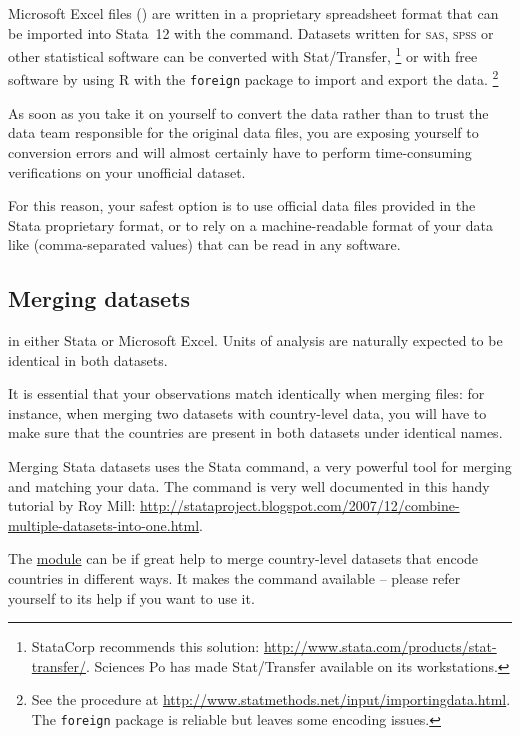 Microsoft Excel files () are written in a proprietary spreadsheet format that can be imported into Stata~12 with the  command. Datasets written for \textsc{sas}, \textsc{spss} or other statistical software can be converted with Stat/Transfer,%
  \footnote{StataCorp recommends this solution: \url{http://www.stata.com/products/stat-transfer/}. Sciences Po has made Stat/Transfer available on its workstations.} %
  or with free software by using R with the \texttt{foreign} package to import and export the data.%
  \footnote{See the procedure at \url{http://www.statmethods.net/input/importingdata.html}. The \texttt{foreign} package is reliable but leaves some encoding issues.}%

As soon as you take it on yourself to convert the data rather than to trust the data team responsible for the original data files, you are exposing yourself to conversion errors and will almost certainly have to perform time-consuming verifications on your unofficial dataset.%

For this reason, your safest option is to use official data files provided in the Stata proprietary format, or to rely on a machine-readable format of your data like  (comma-separated values) that can be read in any software.%

%
\subsection{Merging datasets}
\label{sec:merge}

 in either Stata or Microsoft Excel. Units of analysis are naturally expected to be identical in both datasets.

It is essential that your observations match identically when merging files: for instance, when merging two datasets with country-level data, you will have to make sure that the countries are present in both datasets under identical names.

Merging Stata datasets uses the Stata  command, a very powerful tool for merging and matching your data. The command is very well documented in this handy tutorial by Roy Mill: \url{http://stataproject.blogspot.com/2007/12/combine-multiple-datasets-into-one.html}.

The \href{http://ideas.repec.org/c/boc/bocode/s453301.html}{ module} can be if great help to merge country-level datasets that encode countries in different ways. It makes the  command available -- please refer yourself to its help if you want to use it.


